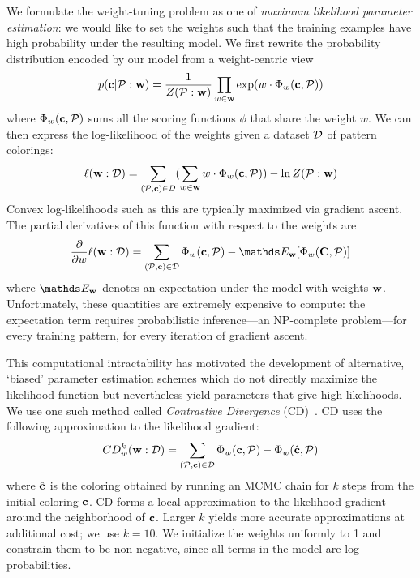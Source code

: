 We formulate the weight-tuning problem as one of \emph{maximum likelihood parameter estimation}: we would like to set the weights such that the training examples have high probability under the resulting model. We first rewrite the probability distribution encoded by our model from a weight-centric view
\begin{equation*}
p(\mathbf{c} | \mathcal{P} : \mathbf{w}) = \frac{1}{Z(\mathcal{P} : \mathbf{w})} \prod_{w \in \mathbf{w}} \exp(w \cdot \Phi_w(\mathbf{c}, \mathcal{P}))
\end{equation*}
where $\Phi_w(\mathbf{c}, \mathcal{P})$ sums all the scoring functions $\phi$ that share the weight $w$. We can then express the log-likelihood of the weights given a dataset $\mathcal{D}$ of pattern colorings:
\begin{equation*}
\ell(\mathbf{w} : \mathcal{D}) =
	\sum_{(\mathcal{P}, \mathbf{c}) \in \mathcal{D}}
	(
		\sum_{w \in \mathbf{w}}
			w \cdot \Phi_w(\mathbf{c}, \mathcal{P})
	)			
		- \ln{Z(\mathcal{P}: \mathbf{w})}
\end{equation*}
Convex log-likelihoods such as this are typically maximized via gradient ascent. The partial derivatives of this function with respect to the weights are
\begin{equation*}
\frac{\partial}{\partial w} \ell(\weights : \dataset) = 
	\sum_{(\pattern, \colors) \in \dataset}
			\weightStats(\colors, \pattern)
		- \expectation_\weights[\weightStats(\colorVars, \pattern)]
\end{equation*}
where $\expectation_\weights$ denotes an expectation under the model with weights $\mathbf{w}$. Unfortunately, these quantities are extremely expensive to compute: the expectation term requires probabilistic inference---an NP-complete problem---for every training pattern, for every iteration of gradient ascent.

This computational intractability has motivated the development of alternative, `biased' parameter estimation schemes which do not directly maximize the likelihood function but nevertheless yield parameters that give high likelihoods. We use one such method called \emph{Contrastive Divergence} (CD)~\cite{ContrastiveDivergence}. CD uses the following approximation to the likelihood gradient:
\begin{equation*}
CD^k_w(\mathbf{w} : \mathcal{D}) = 
	\sum_{(\mathcal{P}, \mathbf{c}) \in \mathcal{D}}
			\Phi_w(\mathbf{c}, \mathcal{P})
		 -\Phi_w(\hat{\mathbf{c}}, \mathcal{P})
\end{equation*}
where $\hat{\mathbf{c}}$ is the coloring obtained by running an MCMC chain for $k$ steps from the initial coloring $\mathbf{c}$. CD forms a local approximation to the likelihood gradient around the neighborhood of $\mathbf{c}$. Larger $k$ yields more accurate approximations at additional cost; we use $k = 10$. We initialize the weights uniformly to 1 and constrain them to be non-negative, since all terms in the model are log-probabilities.

